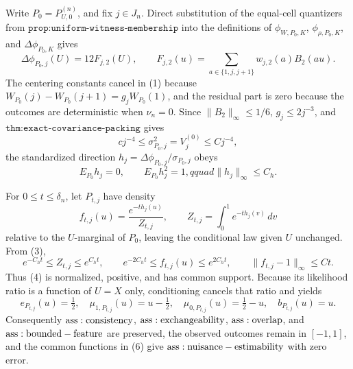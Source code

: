 Write \(P_0=P_{U,0}^{(n)}\), and fix \(j\in J_n\).  Direct substitution of the equal-cell quantizers from \(\texttt{prop:uniform-witness-membership}\) into the definitions of \(\phi_{W,P_0,K}\), \(\phi_{\rho,P_0,K}\), and \(\Delta\phi_{P_0,K}\) gives
\[
 \Delta\phi_{P_0,j}(U)=12F_{j,2}(U),\qquad
 F_{j,2}(u)=\sum_{a\in\{1,j,j+1\}}w_{j,2}(a)B_2(au).                                      \tag{1}
\]
The centering constants cancel in (1) because
\(W_{P_0}(j)-W_{P_0}(j+1)=g_jW_{P_0}(1)\), and the residual part is zero because the outcomes are deterministic when \(\nu_n=0\).  Since \(\|B_2\|_\infty\leq1/6\), \(g_j\leq2j^{-3}\), and \(\texttt{thm:exact-covariance-packing}\) gives
\[
 c j^{-4}\leq\sigma_{P_0,j}^2=V_j^{(0)}\leq Cj^{-4},                                      \tag{2}
\]
the standardized direction \(h_j=\Delta\phi_{P_0,j}/\sigma_{P_0,j}\) obeys
\[
 E_{P_0}h_j=0,\qquad E_{P_0}h_j^2=1,qquad \|h_j\|_\infty\leq C_h.                         \tag{3}
\]

For \(0\leq t\leq\delta_n\), let \(P_{t,j}\) have density
\[
 f_{t,j}(u)=\frac{e^{-t h_j(u)}}{Z_{t,j}},\qquad
 Z_{t,j}=\int_0^1e^{-t h_j(v)}\,dv                                                        \tag{4}
\]
relative to the \(U\)-marginal of \(P_0\), leaving the conditional law given \(U\) unchanged.  From (3),
\[
 e^{-C_ht}\leq Z_{t,j}\leq e^{C_ht},\qquad
 e^{-2C_ht}\leq f_{t,j}(u)\leq e^{2C_ht},\qquad
 \|f_{t,j}-1\|_\infty\leq Ct.                                                           \tag{5}
\]
Thus (4) is normalized, positive, and has common support.  Because its likelihood ratio is a function of \(U=X\) only, conditioning cancels that ratio and yields
\[
 e_{P_{t,j}}(u)=\tfrac12,\quad
 \mu_{1,P_{t,j}}(u)=u-\tfrac12,\quad
 \mu_{0,P_{t,j}}(u)=\tfrac12-u,\quad b_{P_{t,j}}(u)=u.                                   \tag{6}
\]
Consequently \({\rm ass:consistency}\), \({\rm ass:exchangeability}\), \({\rm ass:overlap}\), and \({\rm ass:bounded-feature}\) are preserved, the observed outcomes remain in \([-1,1]\), and the common functions in (6) give \({\rm ass:nuisance-estimability}\) with zero error.

